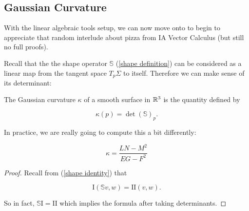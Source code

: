 \documentclass[11pt]{scrartcl}
\begin{document}

\subsection{Gaussian Curvature}

With the linear algebraic tools setup, we can now move onto to begin to appreciate that random interlude about pizza from IA Vector Calculus (but still no full proofs).

\begin{definition}

Recall that the the shape operator $\mathbb{S}$ (\ref{shape definition}) can be considered as a linear map from the tangent space $T_p \Sigma$ to itself. Therefore we can make sense of its determinant:  %

The Gaussian curvature $\kappa$ of a smooth surface in $\mathbb R^3$ is the quantity defined by 

\begin{equation}
    \kappa(p) = \det (\mathbb{S})_p.
\end{equation}
\end{definition}

In practice, we are really going to compute this a bit differently:

\begin{proposition}

\begin{equation}
    \kappa = \frac{LN - M^2}{EG - F^2}
\end{equation}

\begin{proof}
    Recall from (\ref{shape identity}) that 

    \begin{equation}
        \text{I}(\mathbb{S}v,w) = \text{II}(v,w).
    \end{equation}

    So in fact, $\mathbb{S} \text{I} = \text{II}$ which implies the formula after taking determinants.
\end{proof}
\label{det formula}
\end{proposition}
\end{document}
